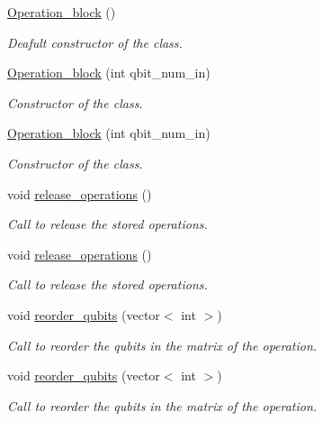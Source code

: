 \begin{DoxyCompactItemize}
\hyperlink{class_operation__block_a3ee535e12ee1edb3923fc0c6340d7567}{Operation\+\_\+block} ()
\begin{DoxyCompactList}\small\item\em Deafult constructor of the class. \end{DoxyCompactList}\item 
\hyperlink{class_operation__block_a8acfc70f86a9777ea272ec4ccdfbc7b7}{Operation\+\_\+block} (int qbit\+\_\+num\+\_\+in)
\begin{DoxyCompactList}\small\item\em Constructor of the class. \end{DoxyCompactList}\item 
\hyperlink{class_operation__block_a8acfc70f86a9777ea272ec4ccdfbc7b7}{Operation\+\_\+block} (int qbit\+\_\+num\+\_\+in)
\begin{DoxyCompactList}\small\item\em Constructor of the class. \end{DoxyCompactList}\item 
void \hyperlink{class_operation__block_a7c3d4eadaef2f21f1c5dd9227faec7ce}{release\+\_\+operations} ()
\begin{DoxyCompactList}\small\item\em Call to release the stored operations. \end{DoxyCompactList}\item 
void \hyperlink{class_operation__block_a7c3d4eadaef2f21f1c5dd9227faec7ce}{release\+\_\+operations} ()
\begin{DoxyCompactList}\small\item\em Call to release the stored operations. \end{DoxyCompactList}\item 
void \hyperlink{class_operation__block_af2a71d29cdbce498e85f11b9ed81e0c9}{reorder\+\_\+qubits} (vector$<$ int $>$)
\begin{DoxyCompactList}\small\item\em Call to reorder the qubits in the matrix of the operation. \end{DoxyCompactList}\item 
void \hyperlink{class_operation__block_af2a71d29cdbce498e85f11b9ed81e0c9}{reorder\+\_\+qubits} (vector$<$ int $>$)
\begin{DoxyCompactList}\small\item\em Call to reorder the qubits in the matrix of the operation. \end{DoxyCompactList}\item 

\end{DoxyCompactItemize}
